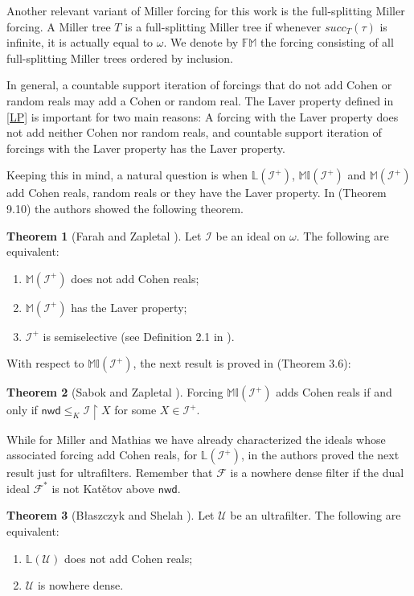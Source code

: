 \documentclass{amsart}
\theoremstyle{definition}
\newtheorem{theorem}{Theorem}[section]
\theoremstyle{remark}
\numberwithin{equation}{section}
\newcommand{\nwd}{\mathsf{nwd}}
\newcommand{\li}{\mathbb{L}(\mathcal{I}^+)}
\newcommand{\lav}{\mathbb{L}}
\newcommand{\mil}{\mathbb{MI}}
\newcommand{\mat}{\mathbb{M}}
\newcommand{\id}{\mathcal{I}}
\begin{document}
Another relevant variant of Miller forcing for this work is the full-splitting Miller forcing. A Miller tree $T$ is a full-splitting Miller tree if whenever $succ_T(\tau)$ is infinite, it is actually equal to $\omega$. We denote by $\mathbb{FM}$ the forcing consisting of all full-splitting Miller trees ordered by inclusion.

In general, a countable support iteration of forcings that do not add Cohen or random reals may add a Cohen or random real. The Laver property defined in \ref{LP} is important for two main reasons: A forcing with the Laver property does not add neither Cohen nor random reals, and countable support iteration of forcings with the Laver property has the Laver property.

Keeping this in mind, a natural question is when $\li$, $\mil(\id^+)$ and $\mat(\id^+)$ add Cohen reals, random reals or they have the Laver property. In \cite{4more} (Theorem 9.10) the authors showed the following theorem.

\begin{theorem} [Farah and Zapletal \cite{4more}]\label{FZ}
    Let $\id$ be an ideal on $\omega$. The following are equivalent:
    \begin{enumerate}
        \item $\mat(\id^+)$ does not add Cohen reals;
        \item $\mat(\id^+)$ has the Laver property;
        \item $\id^+$ is semiselective (see Definition 2.1 in \cite{semiselective}).
    \end{enumerate}
\end{theorem}

With respect to $\mil(\id^+)$, the next result is  proved in \cite{sabok} (Theorem 3.6):

\begin{theorem}[Sabok and Zapletal \cite{sabok}]\label{SZ}
    Forcing $\mil(\id^+)$ adds Cohen reals if and only if $\nwd \leq_K \id\upharpoonright X$ 
for some $X\in\id^+$.
\end{theorem}

While for Miller and Mathias we have already characterized the ideals whose associated forcing add Cohen reals, for $\li$, in \cite{blaszczyk} the authors proved the next result just for ultrafilters. Remember that $\mathcal{F}$ is a nowhere dense filter if the dual ideal $\mathcal{F}^*$ is not Kat\v{e}tov above $\nwd$.

\begin{theorem}[B{\l}aszczyk and Shelah \cite{blaszczyk}]\label{BS}
    Let $\mathcal{U}$ be an ultrafilter. The following are equivalent:
    \begin{enumerate}
        \item $\lav(\mathcal{U})$ does not add Cohen reals;
        \item $\mathcal{U}$ is nowhere dense.
    \end{enumerate}
\end{theorem}
\end{document}
